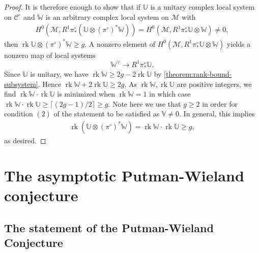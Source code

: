\documentclass[12 pt]{amsart}
\theoremstyle{plain}
\theoremstyle{definition}
\newtheorem{remark}[subsubsection]{Remark}
\theoremstyle{remark}
\numberwithin{equation}{section}
\DeclareMathOperator\rk{rk}
\begin{document}
\begin{proof}
	It is therefore enough to show that if $\mathbb{U}$ is a unitary complex local system on
	$\mathscr C^\circ$ and $\mathbb{W}$ is an arbitrary complex local system on $\mathscr M$
	with
\begin{align*}
	H^0(\mathscr{M}, R^1\pi^\circ_* (\mathbb{U}\otimes (\pi^\circ)^*\mathbb{W}))=
	H^0(\mathscr M, R^1 \pi^\circ_* \mathbb U \otimes \mathbb W) \neq 0,
\end{align*}
	then $\rk \mathbb U \otimes (\pi^\circ)^*\mathbb W \geq g$.
A nonzero element of $H^0(\mathscr M, R^1 \pi^\circ_* \mathbb U \otimes \mathbb W)$ yields a nonzero map of local systems $$\mathbb{W}^\vee\to R^1\pi^\circ_*\mathbb{U}.$$
Since $\mathbb U$ is unitary, we have
$\rk \mathbb{W} \geq 2g - 2\rk \mathbb U$
by \autoref{theorem:rank-bound-subsystem}. 
Hence $\rk \mathbb{W} + 2\rk \mathbb{U} \geq 2g$.
As $\rk \mathbb{W}, \rk\mathbb{U}$ are positive integers, we find 
$\rk \mathbb W \cdot \rk \mathbb U$ is minimized when $\rk \mathbb W = 1$
in which case $\rk \mathbb W \cdot \rk \mathbb U \geq \lceil (2g-1)/2 \rceil \geq g$. 
Note here we use that $g \geq 2$ in order for condition $(2)$ of the statement to be
satisfied as $\mathbb V \neq 0$.
In general, this implies
\begin{align}
	\label{equation:rank-product-bound}
\rk (\mathbb{U}\otimes (\pi^\circ)^*\mathbb{W})=\rk \mathbb W \cdot \rk \mathbb U \geq g,
\end{align}
as desired.
\end{proof}


\section{The asymptotic Putman-Wieland conjecture}
\label{section:Putman-Wieland}
\subsection{The statement of the Putman-Wieland Conjecture}
\label{subsection:geometric-setup}
\end{document}
